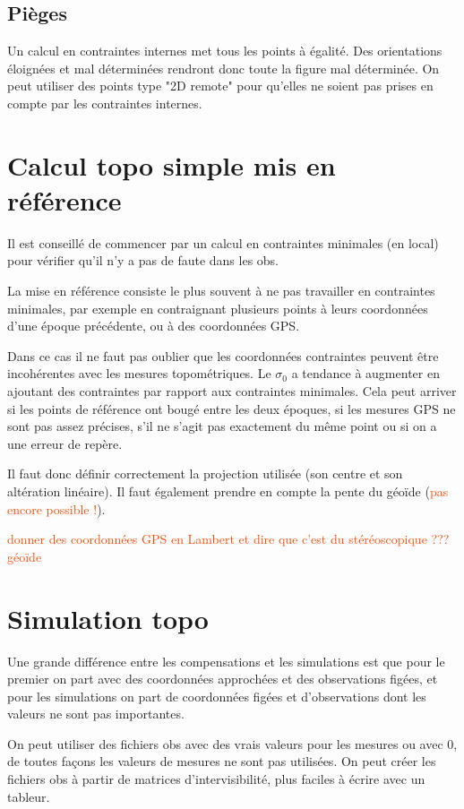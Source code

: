 \documentclass[french]{report}
\newcommand{\revoir}[1]{\textcolor{OrangeRed}{#1}}
\begin{document}
\subsection{Pièges}



Un calcul en contraintes internes met tous les points à égalité. Des orientations éloignées et mal déterminées rendront donc
toute la figure mal déterminée. On peut utiliser des points type "2D remote" pour qu'elles ne soient pas prises en compte par les contraintes internes.




\section{Calcul topo simple mis en référence}
Il est conseillé de commencer par un calcul en contraintes minimales (en local) pour vérifier qu'il n'y a pas de faute dans les obs.

La mise en référence consiste le plus souvent à ne pas travailler en contraintes minimales, par exemple en contraignant plusieurs points
à leurs coordonnées d'une époque précédente, ou à des coordonnées GPS.

Dans ce cas il ne faut pas oublier que les coordonnées contraintes peuvent être incohérentes avec les mesures topométriques.
Le $\sigma_0$ a tendance à augmenter en ajoutant des contraintes par rapport aux contraintes minimales.
Cela peut arriver si les points de référence ont bougé entre les deux époques, si les mesures GPS ne sont pas assez précises,
s'il ne s'agit pas exactement du même point ou si on a une erreur de repère.

Il faut donc définir correctement la projection utilisée (son centre et son altération linéaire). Il faut également prendre en compte
la pente du géoïde (\revoir{pas encore possible !}).

\revoir{donner des coordonnées GPS en Lambert et dire que c'est du stéréoscopique ???}
\revoir{géoïde}

\section{Simulation topo}
Une grande différence entre les compensations et les simulations est que pour le premier on part avec des coordonnées approchées et des observations figées,
et pour les simulations on part de coordonnées figées et d'observations dont les valeurs ne sont pas importantes.

On peut utiliser des fichiers obs avec des vrais valeurs pour les mesures ou avec 0, de toutes façons les valeurs de mesures ne sont pas utilisées.
On peut créer les fichiers obs à partir de matrices d'intervisibilité, plus faciles à écrire avec un tableur.
\end{document}
